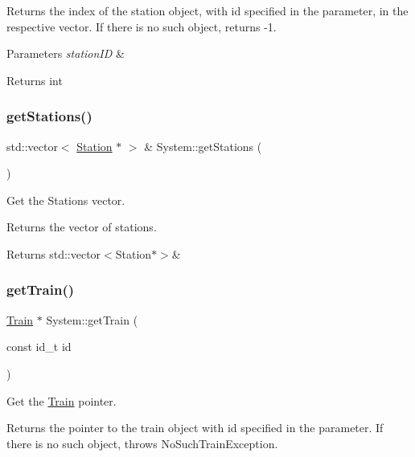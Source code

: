 Returns the index of the station object, with id specified in the parameter, in the respective vector. If there is no such object, returns -\/1.


\begin{DoxyParams}{Parameters}
{\em station\+ID} & \\
\hline
\end{DoxyParams}
\begin{DoxyReturn}{Returns}
int 
\end{DoxyReturn}
\mbox{\label{classSystem_a6f27512fba42cc093efd34fe10bf0045}} 
\subsubsection{\texorpdfstring{get\+Stations()}{getStations()}}
{\footnotesize\ttfamily std\+::vector$<$ \mbox{\hyperlink{classStation}{Station}} $\ast$ $>$ \& System\+::get\+Stations (\begin{DoxyParamCaption}{ }\end{DoxyParamCaption})}



Get the Stations vector. 

Returns the vector of stations.

\begin{DoxyReturn}{Returns}
std\+::vector$<$\+Station$\ast$$>$\& 
\end{DoxyReturn}
\mbox{\label{classSystem_ac29b91a9dca7dd1bb4c39769a75d444f}} 
\subsubsection{\texorpdfstring{get\+Train()}{getTrain()}}
{\footnotesize\ttfamily \mbox{\hyperlink{classTrain}{Train}} $\ast$ System\+::get\+Train (\begin{DoxyParamCaption}\item[{const id\+\_\+t}]{id }\end{DoxyParamCaption})}



Get the \mbox{\hyperlink{classTrain}{Train}} pointer. 

Returns the pointer to the train object with id specified in the parameter. If there is no such object, throws No\+Such\+Train\+Exception.


